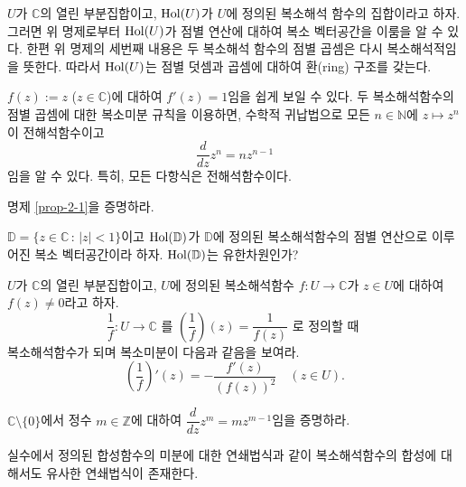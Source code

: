 \begin{salt_remark}\label{remark-2-1}
$U$가 $\mathbb C$의 열린 부분집합이고,
$\mathop{\mathrm{Hol}}(U)$가 $U$에 정의된 복소해석 함수의 집합이라고 하자.
그러면 위 명제로부터 $\mathop{\mathrm{Hol}}(U)$가 점별 연산에 대하여 복소 벡터공간을 이룸을 알 수 있다.
한편 위 명제의 세번째 내용은 두 복소해석 함수의 점별 곱셈은 다시 복소해석적임을 뜻한다.
따라서 $\mathop{\mathrm{Hol}}(U)$는 점별 덧셈과 곱셈에 대하여
환(ring) 구조를 갖는다.
\end{salt_remark}

\begin{salt_example}\label{example-2-3}
$f(z):=z$ ($z\in \mathbb C$)에 대하여 $f'(z)=1$임을 쉽게 보일 수 있다.
두 복소해석함수의 점별 곱셈에 대한 복소미분 규칙을 이용하면,
수학적 귀납법으로 모든 $n\in \mathbb N$에 $z\mapsto z^n$이 전해석함수이고
\[
\dfrac{d}{dz} z^n = nz^{n-1}
\]
임을 알 수 있다.
특히, 모든 다항식은 전해석함수이다.
\end{salt_example}

\begin{salt_exercise} \label{ex-2-4}
명제 \ref{prop-2-1}을 증명하라.
\end{salt_exercise}


\begin{salt_exercise} \label{ex-2-5}
$\mathbb D = \{ z\in\mathbb C \,:\, |z|<1 \}$이고
$\mathop{\mathrm{Hol}}(\mathbb D)$가 $\mathbb D$에 정의된 복소해석함수의 점별 연산으로 이루어진
복소 벡터공간이라 하자.  $\mathop{\mathrm{Hol}}(\mathbb D)$는 유한차원인가?
\end{salt_exercise}


\begin{salt_exercise} \label{ex-2-6}
$U$가 $\mathbb C$의 열린 부분집합이고,
$U$에 정의된 복소해석함수 $f:U\to \mathbb C$가 
$z\in U$에 대하여 $f(z)\ne 0$라고 하자.
\[
\dfrac 1f : U \to \mathbb C \text{ 를 }
\left( \dfrac 1f \right) (z) = \dfrac 1{f(z)} \text{ 로 정의할 때 }
\]
복소해석함수가 되며 복소미분이 다음과 같음을 보여라.
\[
\left( \dfrac 1f \right)' (z) = - \dfrac{f'(z)}{(f(z))^2} \quad (z\in U).
\]
\end{salt_exercise}

\begin{salt_exercise} \label{ex-2-7}
$\mathbb C\setminus \{0\}$에서 정수 $m\in\mathbb Z$에 대하여
$\dfrac d{dz} z^m = mz^{m-1}$임을 증명하라.
\end{salt_exercise}

실수에서 정의된 합성함수의 미분에 대한 연쇄법식과 같이
복소해석함수의 합성에 대해서도 유사한 연쇄법식이 존재한다.

